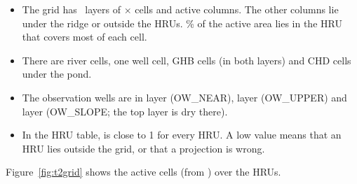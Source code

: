 \begin{tocheck}
\begin{itemize}
\item The grid has ~layers of $\times$ cells and  active columns. The
   other columns lie under the ridge or outside the HRUs. \% of the active area lies in
  the HRU that covers most of each cell.
\item There are  river cells, one well cell,  GHB cells (in both layers) and
   CHD cells under the pond.
\item The observation wells are in layer  (OW\_NEAR), layer  (OW\_UPPER) and layer
   (OW\_SLOPE; the top layer is dry there).
\item In the HRU table,  is close to 1 for every HRU. A low value means that an HRU lies
  outside the grid, or that a projection is wrong.
\end{itemize}
\end{tocheck}
Figure~\ref{fig:t2grid} shows the active cells (from ) over the HRUs.
